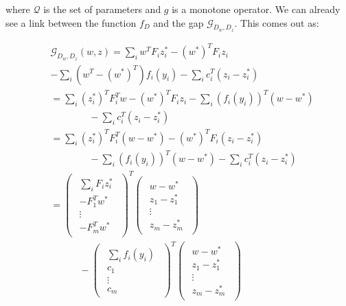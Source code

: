 \documentclass{article}
\begin{document}
where $\mathcal{Q}$ is the set of parameters and $g$ is a monotone
operator. We can already see a link between the function $f_D$ and the gap
$\mathcal{G}_{D_{ w}, D_{ z}}$. This comes out as:

\begin{equation}
  \begin{aligned}
    &\mathcal{G}_{D_{ w},D_{ z}}( w,  z) = \sum_i  w^T  F_i  z_i^* - ( w^*)^T  F_i  z_i\\
    &- \sum_i ( w^T - ( w^*)^T )  f_i ( y_i)- \sum_i  c_i^T ( z_i -  z_i^*)\\
    &= \sum_i ( z_i^*)^T  F_i^T  w - ( w^*)^T  F_i  z_i - \sum_i  ( f_i ( y_i))^T ( w -  w^*)\\
    &\quad\quad\quad\quad- \sum_i  c_i^T ( z_i -  z_i^*)\\
    &= \sum_i ( z_i^*)^T  F_i^T ( w -  w^*) - ( w^*)^T  F_i ( z_i -  z_i^*)\\
    &\quad\quad\quad\quad- \sum_i ( f_i( y_i))^T ( w -  w^*) - \sum_i  c_i^T ( z_i -  z_i^*)\\
    &=  
    \begin{pmatrix}
      \begin{array}{c}
        \sum_i  F_i  z_i^*\\
	- F_1^T  w^*\\
	\vdots\\
	- F_m^T  w^*
      \end{array}
    \end{pmatrix}^T 
    \begin{pmatrix}
      \begin{array}{c}
	 w -  w^*\\
	 z_1 -  z_1^*\\
	\vdots\\
	 z_m -  z_m^*
      \end{array}
    \end{pmatrix}\\
    &\quad\quad\quad-\begin{pmatrix}
      \begin{array}{c}
	\sum_i  f_i( y_i)\\
	 c_1\\
	\vdots\\
	 c_m
      \end{array}
    \end{pmatrix}^T
    \begin{pmatrix}
      \begin{array}{c}
	 w -  w^*\\
	 z_1 -  z_1^*\\
	\vdots\\
	 z_m -  z_m^*
      \end{array}
    \end{pmatrix}
  \end{aligned}
\end{equation}
\end{document}
